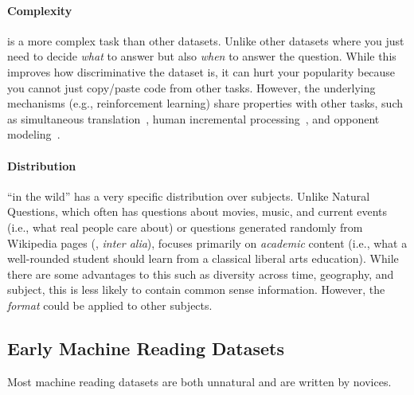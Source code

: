 \paragraph{Complexity} 

\qb{} is a more complex task than other datasets.  
Unlike other datasets where you just need to decide \emph{what} to answer but also \emph{when} to answer the question.
While this improves how discriminative the dataset is, it can hurt your popularity because you cannot just copy/paste code from other  tasks.
However, the underlying mechanisms (e.g., reinforcement learning) share properties with other tasks, such as simultaneous translation~\cite{grissom:he:boyd-graber:morgan-2014,ma-etal-2019-stacl}, human incremental processing~\cite{levy-08,levy-11}, and opponent modeling~\cite{he-16}.


\paragraph{Distribution} 

\qb{} ``in the wild'' has a very specific distribution over subjects.
Unlike Natural Questions, which often has questions about movies, music, and current events (i.e., what real people care about)
or questions generated randomly from Wikipedia pages (\squad{}, \textit{inter alia}),
\qb{} focuses primarily on \emph{academic} content (i.e., what a well-rounded student should learn from a classical liberal arts education).
While there are some advantages to this such as diversity across time, geography, and subject, this is less likely to contain common sense information.
However, the \qb{} \emph{format} could be applied to other subjects.


\subsection{Early Machine Reading Datasets}

Most machine reading datasets are both unnatural and are written by novices.

